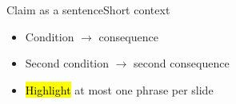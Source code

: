 \begin{frame}[c]{Claim as a sentence}{Short context}
  \begin{itemize}
    \item Condition \(\to\) consequence
    \item Second condition \(\to\) second consequence
    \item \hl{Highlight} at most one phrase per slide
  \end{itemize}
\end{frame}
